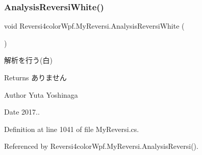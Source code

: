 \subsubsection{\texorpdfstring{Analysis\+Reversi\+White()}{AnalysisReversiWhite()}}
{\footnotesize\ttfamily void Reversi4color\+Wpf.\+My\+Reversi.\+Analysis\+Reversi\+White (\begin{DoxyParamCaption}{ }\end{DoxyParamCaption})\hspace{0.3cm}{\ttfamily [private]}}



解析を行う(白) 

\begin{DoxyReturn}{Returns}
ありません 
\end{DoxyReturn}
\begin{DoxyAuthor}{Author}
Yuta Yoshinaga 
\end{DoxyAuthor}
\begin{DoxyDate}{Date}
2017.. 
\end{DoxyDate}


Definition at line 1041 of file My\+Reversi.\+cs.



Referenced by Reversi4color\+Wpf.\+My\+Reversi.\+Analysis\+Reversi().

